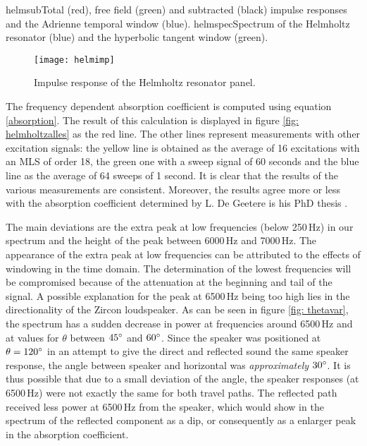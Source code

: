   

	{helmsub}{Total (red), free field (green) and subtracted (black) impulse responses and the Adrienne temporal window (blue).}
	{helmspec}{Spectrum of the Helmholtz resonator (blue) and the hyperbolic tangent window (green).}


\begin{figure}[h!]
  \centering
    \texttt{[image: helmimp]}
  \caption{Impulse response of the Helmholtz resonator panel.}
  \label{fig: helmimp}
\end{figure}

The frequency dependent absorption coefficient is computed using equation \ref{absorption}. The result of this calculation is displayed in figure \ref{fig: helmholtzalles} as the red line. The other lines represent measurements with other excitation signals: the yellow line is obtained as the average of 16 excitations with an MLS of order 18, the green one with a sweep signal of 60 seconds and the blue line as the average of 64 sweeps of 1 second. It is clear that the results of the various measurements are consistent. Moreover, the results agree more or less with the absorption coefficient determined by L. De Geetere is his PhD thesis \cite[p.84]{Geetere}. 

The main deviations are the extra peak at low frequencies (below 250\,Hz) in our spectrum and the height of the peak between 6000\,Hz and 7000\,Hz. The appearance of the extra peak at low frequencies can be attributed to the effects of windowing in the time domain. The determination of the lowest frequencies will be compromised because of the attenuation at the beginning and tail of the signal. A possible explanation for the peak at 6500\,Hz being too high lies in the directionality of the Zircon loudspeaker. As can be seen in figure \ref{fig: thetavar}, the spectrum has a sudden decrease in power at frequencies around 6500\,Hz and at values for $\theta$ between $45^{\circ}$ and $60^{\circ}$. Since the speaker was positioned at $\theta = 120^{\circ}$ in an attempt to give the direct and reflected sound the same speaker response, the angle between speaker and horizontal was \emph{approximately} $30^{\circ}$. It is thus possible that due to a small deviation of the angle, the speaker responses (at 6500\,Hz) were not exactly the same for both travel paths. The reflected path received less power at 6500\,Hz from the speaker, which would show in the spectrum of the reflected component as a dip, or consequently as a enlarger peak in the absorption coefficient.


